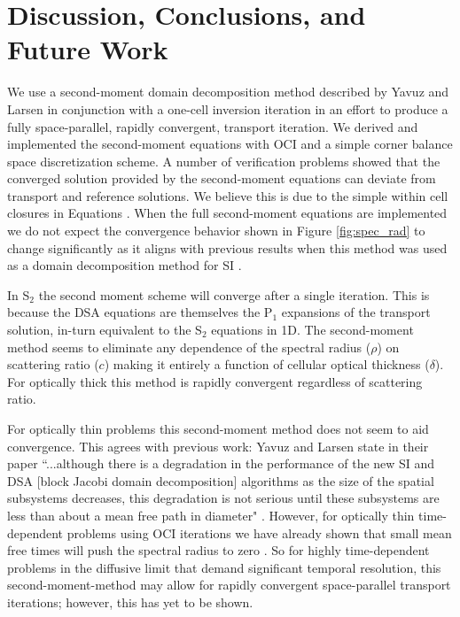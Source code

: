 \section{Discussion, Conclusions, and Future Work}

We use a second-moment domain decomposition method described by Yavuz and Larsen \cite{yavuz_spatial_1989} in conjunction with a one-cell inversion iteration \cite{rosa_cellwise_2013, morgan_2025_oci} in an effort to produce a fully space-parallel, rapidly convergent, transport iteration.
We derived and implemented the second-moment equations with OCI and a simple corner balance space discretization scheme.
A number of verification problems showed that the converged solution provided by the second-moment equations can deviate from transport and reference solutions.
We believe this is due to the simple within cell closures in Equations \label{eq:simple_close}.
When the full second-moment equations are implemented we do not expect the convergence behavior shown in Figure \ref{fig:spec_rad} to change significantly as it aligns with previous results when this method was used as a domain decomposition method for SI \cite{yavuz_spatial_1989}.

In S$_2$ the second moment scheme will converge after a single iteration.
This is because the DSA equations are themselves the P$_1$ expansions of the transport solution, in-turn equivalent to the S$_2$ equations in 1D.
The second-moment method seems to eliminate any dependence of the spectral radius ($\rho$) on scattering ratio ($c$) making it entirely a function of cellular optical thickness ($\delta$).
For optically thick this method is rapidly convergent regardless of scattering ratio.

For optically thin problems this second-moment method does not seem to aid convergence.
This agrees with previous work: Yavuz and Larsen state in their paper ``...although there is a degradation in the performance of the new SI and DSA [block Jacobi domain decomposition] algorithms as the size of the spatial subsystems decreases, this degradation is not serious until these subsystems are less than about a mean free path in diameter" \cite{yavuz_spatial_1989}. 
However, for optically thin time-dependent problems using OCI iterations we have already shown that small mean free times will push the spectral radius to zero \cite{morgan_2025_oci}.
So for highly time-dependent problems in the diffusive limit that demand significant temporal resolution, this second-moment-method may allow for rapidly convergent space-parallel transport iterations; however, this has yet to be shown.

